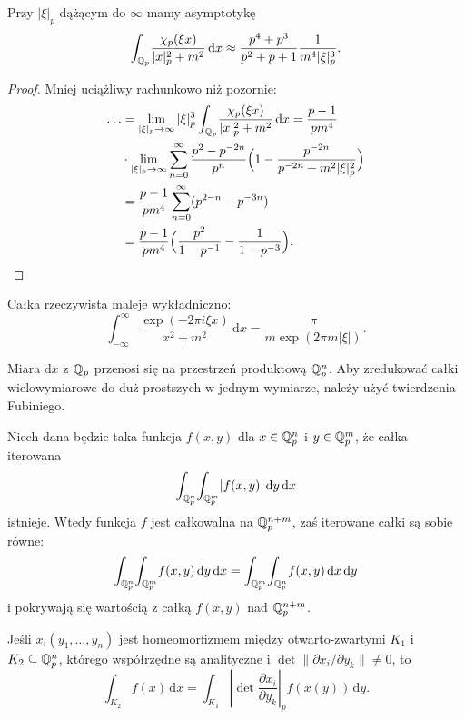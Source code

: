 \begin{wniosek}
	Przy $|\xi|_p$ dążącym do $\infty$ mamy asymptotykę \[\int_{\mathbb Q_p} \!\frac{\chi_p(\xi x)}{|x|_p^2 + m^2} \,\textrm{d}x \approx \frac{p^4 + p^3}{p^2 + p + 1} \frac{1}{m^4 |\xi|_p^3}.\]
\end{wniosek}

\begin{proof}
	Mniej uciążliwy rachunkowo niż pozornie:
	\begin{align*}
		\ldots & = \lim_{|\xi|_p \to \infty} |\xi|_p^3 \int_{\mathbb Q_p} \!\frac{\chi_p(\xi x)}{|x|_p^2 + m^2} \,\textrm{d}x = \frac{p-1}{pm^4} \\
		& \cdot \lim_{|\xi|_p \to \infty} \sum_{n=0}^\infty \frac{p^2-p^{-2n}}{p^n} \Bigl(1-\frac{p^{-2n}}{p^{-2n} + m^2 |\xi|_p^2}\Bigr)\\
		& = \frac{p-1}{pm^4} \sum_{n=0}^\infty (p^{2-n} - p^{-3n}) \\
		& = \frac{p-1}{pm^4} \Bigl( \frac{p^2}{1-p^{-1}} - \frac{1}{1-p^{-3}} \Bigr). \qedhere
	\end{align*}
\end{proof}

Całka rzeczywista maleje wykładniczno:
\[
	\int_{-\infty}^\infty \frac{\exp(-2 \pi i \xi x)}{x^2 + m^2} \,\textrm{d}x = \frac{\pi}{m \exp(2 \pi m |\xi|)}.
\]

Miara $\textrm{d}x$ z $\mathbb Q_p$ przenosi się na przestrzeń produktową $\mathbb Q_p^n$.
Aby zredukować całki wielowymiarowe do duż prostszych w jednym wymiarze, należy użyć twierdzenia Fubiniego.

\begin{twierdzenie}[Fubini]
	Niech dana będzie taka funkcja $f(x, y)$ dla $x \in \mathbb Q_p^n$ i $y \in \mathbb Q_p^m$, że całka iterowana
	\[
		\int_{\mathbb Q_p^n} \!\int_{\mathbb Q_p^m} \!|f(x,y)| \,\textrm{d}y \,\textrm{d}x
	\]
	istnieje.
	Wtedy funkcja $f$ jest całkowalna na $\mathbb Q_p^{n+m}$, zaś iterowane całki są sobie równe:
	\[
		\int_{\mathbb Q_p^n} \!\int_{\mathbb Q_p^m} \!f(x,y) \,\textrm{d}y \,\textrm{d}x = \int_{\mathbb Q_p^m} \!\int_{\mathbb Q_p^n} \!f(x,y) \,\textrm{d}x \,\textrm{d}y
	\]
	i pokrywają się wartością z całką $f(x, y)$ nad $\mathbb Q_p^{n+m}$.
\end{twierdzenie}

\begin{fakt}
	Jeśli $x_i(y_1, \ldots, y_n)$ jest homeomorfizmem między otwarto-zwartymi $K_1$ i $K_2 \subseteq \mathbb Q_p^n$, którego współrzędne są analityczne i $\det \|\partial x_i / \partial y_k \| \neq 0$, to \[\int_{K_2} f(x) \,\textrm{d}x =  \int_{K_1} \left| \det \frac{\partial x_i}{\partial y_k} \right|_p f(x(y)) \,\textrm{d}y.\]
\end{fakt}


